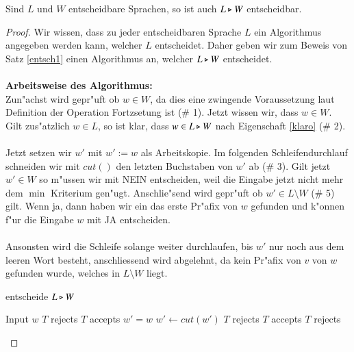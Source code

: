 \begin{satz}\label{entsch1}
Sind $L$ und $W$ entscheidbare Sprachen, so ist auch $L\triangleright W$ entscheidbar.
\end{satz}
\begin{proof}
Wir wissen, dass zu jeder entscheidbaren Sprache $L$ ein Algorithmus angegeben werden kann, welcher $L$ entscheidet. Daher geben wir zum Beweis von Satz \ref{entsch1} einen Algorithmus an, welcher $L\triangleright W$ entscheidet.\\\\
\textbf{Arbeitsweise des Algorithmus:}\\
Zun"achst wird gepr"uft ob $w\in W$, da dies eine zwingende Voraussetzung laut Definition der Operation Fortzsetung ist (\# 1).
Jetzt wissen wir, dass $w\in W$. Gilt zus"atzlich $w\in L$, so ist klar, dass $w\in L\triangleright W$ nach Eigenschaft \ref{klaro} (\# 2).\\\\
Jetzt setzen wir $w'$ mit $w':=w$ als Arbeitskopie. Im folgenden Schleifendurchlauf schneiden wir mit $cut()$ den letzten Buchstaben von $w'$ ab (\# 3). 
Gilt jetzt $w'\in W$ so m"ussen wir mit NEIN entscheiden, weil die Eingabe jetzt nicht mehr dem $\min$ Kriterium gen"ugt.
Anschlie"send wird gepr"uft ob $w'\in L\setminus W$ (\# 5) gilt. Wenn ja, dann haben wir ein das erste Pr"afix von $w$ gefunden und k"onnen f"ur die Eingabe $w$ mit JA entscheiden.
\\\\Ansonsten wird die Schleife solange weiter durchlaufen, bis $w'$ nur noch aus dem leeren Wort besteht, anschliessend wird abgelehnt, da kein Pr"afix von $v$ von $w$ gefunden wurde, welches in $L\setminus W$ liegt.
\begin{algorithm}
\caption{entscheide $L\triangleright W$}
\label{split}
\begin{algorithmic}
\STATE Input $w$
\STATE $T$ rejects 
\ELSE
{}
\STATE $T$ accepts  
\ENDIF
\ENDIF
\STATE $w' = w$  
\REPEAT
\STATE $w' \leftarrow \mathit{cut}(w')$ 
\STATE $T$ rejects
\ENDIF
{}
\STATE $T$ accepts
\ENDIF
{}
\STATE $T$ rejects
\end{algorithmic}
\end{algorithm}

\end{proof}


